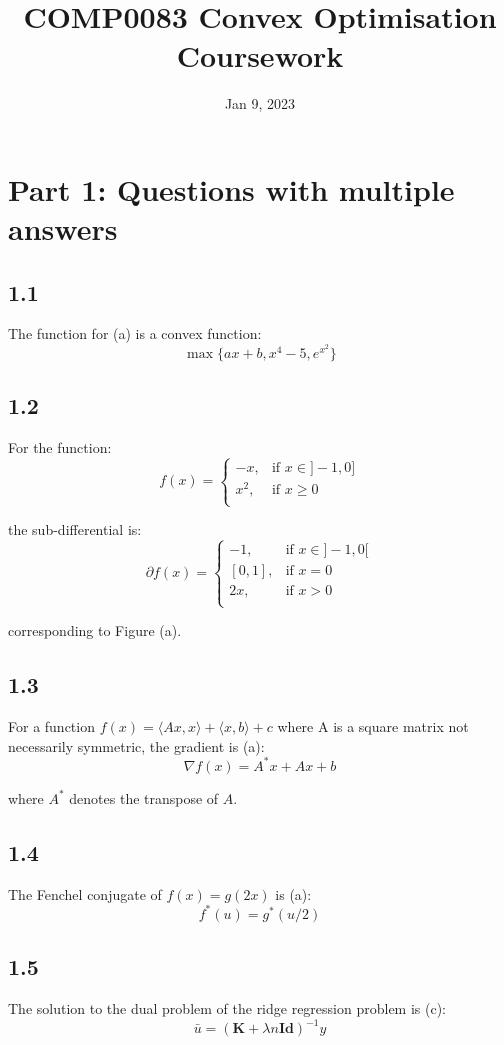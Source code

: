 \documentclass[12pt]{article}
\title{\textbf{COMP0083 Convex Optimisation Coursework}}
\date{Jan 9, 2023}
\begin{document}
\maketitle
\section*{Part 1: Questions with multiple answers}
\subsection*{1.1}
The function for (a) is a convex function:
\[\max\{ax+b, x^4-5, e^{x^2}\}\]

\subsection*{1.2}

For the function:
\[f(x) = \begin{cases}
      -x, & \text{if } x \in ]-1, 0] \\
      x^2, & \text{if } x \geq 0 \\
   \end{cases}\]

the sub-differential is:
\[\partial f(x) = \begin{cases}
      -1, & \text{if } x \in ]-1, 0[ \\
      \left[0, 1\right], & \text{if } x = 0  \\
      2x, & \text{if } x > 0 \\
   \end{cases}\]

corresponding to Figure (a).

\subsection*{1.3}
For a function $f(x) = \langle Ax, x \rangle + \langle x, b\rangle + c$ where A is a square matrix not necessarily symmetric, the gradient is (a):
\[\nabla f(x) = A^*x + Ax + b\]

where $A^*$ denotes the transpose of $A$.
\subsection*{1.4}
The Fenchel conjugate of $f(x) = g(2x)$ is (a):
\[f^*(u) = g^*(u/2)\]

\subsection*{1.5}
The solution to the dual problem of the ridge regression problem is (c):
\[\bar{u} = (\textbf{K}+\lambda n \textbf{Id})^{-1} y\]
\end{document}
